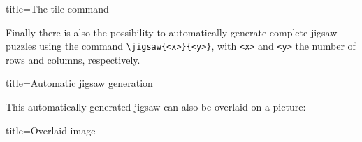 \documentclass[parskip=half]{scrartcl}
\begin{document}
\begin{tcblisting}{title={The tile command}}
%
%

%
%

%
%
\end{tcblisting}

Finally there is also the possibility to automatically generate complete jigsaw puzzles using the command \lstinline|\jigsaw{<x>}{<y>}|, with \lstinline|<x>| and \lstinline|<y>| the number of rows and columns, respectively.

\begin{tcblisting}{title={Automatic jigsaw generation}}
\end{tcblisting}

This automatically generated jigsaw can also be overlaid on a picture:

\begin{tcblisting}{title={Overlaid image}}
\end{tcblisting}
\end{document}
